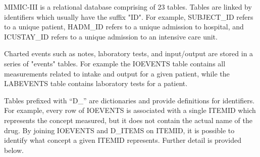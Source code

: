\documentclass[english]{article}
\begin{document}



MIMIC-III is a relational database comprising of 23 tables. Tables are linked by identifiers which usually have the suffix "ID". For example, SUBJECT\_ID refers to a unique patient, HADM\_ID refers to a unique admission to hospital, and ICUSTAY\_ID refers to a unique admission to an intensive care unit. 

Charted events such as notes, laboratory tests, and input/output are stored in a series of "events" tables. For example the IOEVENTS table contains all measurements related to intake and output for a given patient, while the LABEVENTS table contains laboratory tests for a patient.

Tables prefixed with “D\_” are dictionaries and provide definitions for identifiers. For example, every row of IOEVENTS is associated with a single ITEMID which represents the concept measured, but it does not contain the actual name of the drug. By joining IOEVENTS and D\_ITEMS on ITEMID, it is possible to identify what concept a given ITEMID represents. Further detail is provided below.
\end{document}
